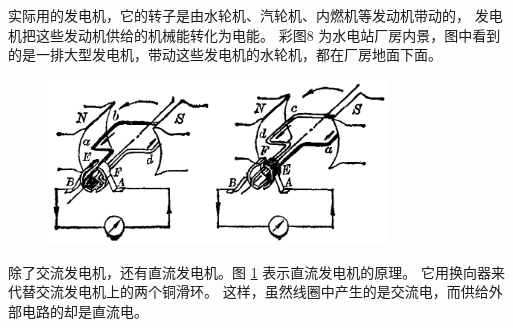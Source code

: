 实际用的发电机，它的转子是由水轮机、汽轮机、内燃机等发动机带动的，
发电机把这些发动机供给的机械能转化为电能。
彩图8 为水电站厂房内景，图中看到的是一排大型发电机，带动这些发电机的水轮机，都在厂房地面下面。

\begin{figure}[htbp]
    \centering
    \includegraphics[width=0.8\textwidth]{../pic/czwl2-ch10-48}
    \caption{}\label{fig:10-48}
\end{figure}

除了交流发电机，还有直流发电机。图 \ref{fig:10-48} 表示直流发电机的原理。
它用换向器来代替交流发电机上的两个铜滑环。
这样，虽然线圈中产生的是交流电，而供给外部电路的却是直流电。

